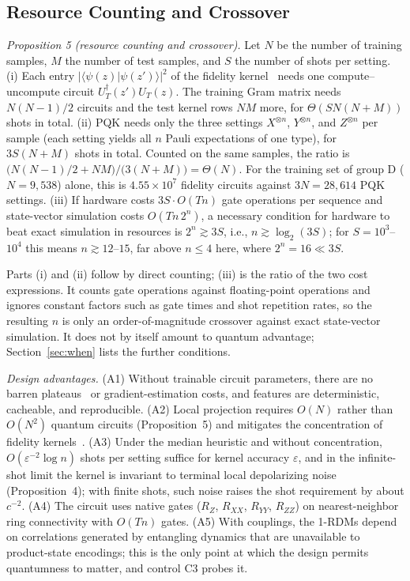 \documentclass[conference]{IEEEtran}
\begin{document}
\subsection{Resource Counting and Crossover}
\label{sec:resources}

\textit{Proposition 5 (resource counting and crossover).} Let $N$ be the number of training samples, $M$ the number of test samples, and $S$ the number of shots per setting. (i) Each entry $|\langle\psi(z)|\psi(z')\rangle|^2$ of the fidelity kernel~\cite{havlicek2019} needs one compute--uncompute circuit $U_T^{\dagger}(z')U_T(z)$. The training Gram matrix needs $N(N-1)/2$ circuits and the test kernel rows $NM$ more, for $\Theta(SN(N+M))$ shots in total. (ii) PQK needs only the three settings $X^{\otimes n}$, $Y^{\otimes n}$, and $Z^{\otimes n}$ per sample (each setting yields all $n$ Pauli expectations of one type), for $3S(N+M)$ shots in total. Counted on the same samples, the ratio is $\big(N(N-1)/2+NM\big)/\big(3(N+M)\big)=\Theta(N)$. For the training set of group D ($N=9{,}538$) alone, this is $4.55\times10^7$ fidelity circuits against $3N=28{,}614$ PQK settings. (iii) If hardware costs $3S\cdot O(Tn)$ gate operations per sequence and state-vector simulation costs $O(Tn\,2^{n})$, a necessary condition for hardware to beat exact simulation in resources is $2^{n}\gtrsim 3S$, i.e., $n\gtrsim\log_2(3S)$; for $S=10^{3}$--$10^{4}$ this means $n\gtrsim12$--$15$, far above $n\le4$ here, where $2^n=16\ll3S$.

Parts (i) and (ii) follow by direct counting; (iii) is the ratio of the two cost expressions. It counts gate operations against floating-point operations and ignores constant factors such as gate times and shot repetition rates, so the resulting $n$ is only an order-of-magnitude crossover against exact state-vector simulation. It does not by itself amount to quantum advantage; Section~\ref{sec:when} lists the further conditions.

\textit{Design advantages.} (A1) Without trainable circuit parameters, there are no barren plateaus~\cite{mcclean2018barren} or gradient-estimation costs, and features are deterministic, cacheable, and reproducible. (A2) Local projection requires $O(N)$ rather than $O(N^2)$ quantum circuits (Proposition~5) and mitigates the concentration of fidelity kernels~\cite{huang2021power}. (A3) Under the median heuristic and without concentration, $O(\varepsilon^{-2}\log n)$ shots per setting suffice for kernel accuracy $\varepsilon$, and in the infinite-shot limit the kernel is invariant to terminal local depolarizing noise (Proposition~4); with finite shots, such noise raises the shot requirement by about $c^{-2}$. (A4) The circuit uses native gates ($R_Z$, $R_{XX}$, $R_{YY}$, $R_{ZZ}$) on nearest-neighbor ring connectivity with $O(Tn)$ gates. (A5) With couplings, the 1-RDMs depend on correlations generated by entangling dynamics that are unavailable to product-state encodings; this is the only point at which the design permits quantumness to matter, and control C3 probes it.
\end{document}

